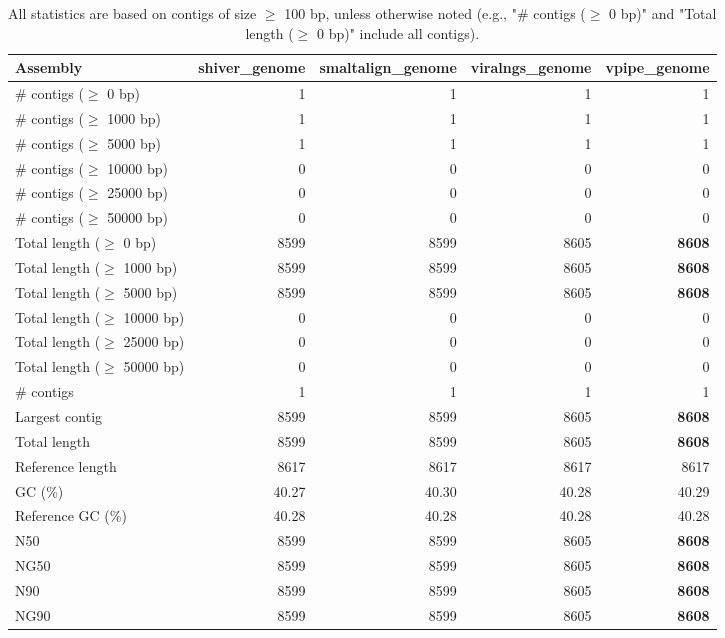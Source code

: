\documentclass[12pt,a4paper]{article}
\begin{document}
\begin{table}[ht]
\begin{center}
\caption{All statistics are based on contigs of size $\geq$ 100 bp, unless otherwise noted (e.g., "\# contigs ($\geq$ 0 bp)" and "Total length ($\geq$ 0 bp)" include all contigs).}
\begin{tabular}{|l*{4}{|r}|}
\hline
Assembly & shiver\_genome & smaltalign\_genome & viralngs\_genome & vpipe\_genome \\ \hline
\# contigs ($\geq$ 0 bp) & 1 & 1 & 1 & 1 \\ \hline
\# contigs ($\geq$ 1000 bp) & 1 & 1 & 1 & 1 \\ \hline
\# contigs ($\geq$ 5000 bp) & 1 & 1 & 1 & 1 \\ \hline
\# contigs ($\geq$ 10000 bp) & 0 & 0 & 0 & 0 \\ \hline
\# contigs ($\geq$ 25000 bp) & 0 & 0 & 0 & 0 \\ \hline
\# contigs ($\geq$ 50000 bp) & 0 & 0 & 0 & 0 \\ \hline
Total length ($\geq$ 0 bp) & 8599 & 8599 & 8605 & {\bf 8608} \\ \hline
Total length ($\geq$ 1000 bp) & 8599 & 8599 & 8605 & {\bf 8608} \\ \hline
Total length ($\geq$ 5000 bp) & 8599 & 8599 & 8605 & {\bf 8608} \\ \hline
Total length ($\geq$ 10000 bp) & 0 & 0 & 0 & 0 \\ \hline
Total length ($\geq$ 25000 bp) & 0 & 0 & 0 & 0 \\ \hline
Total length ($\geq$ 50000 bp) & 0 & 0 & 0 & 0 \\ \hline
\# contigs & 1 & 1 & 1 & 1 \\ \hline
Largest contig & 8599 & 8599 & 8605 & {\bf 8608} \\ \hline
Total length & 8599 & 8599 & 8605 & {\bf 8608} \\ \hline
Reference length & 8617 & 8617 & 8617 & 8617 \\ \hline
GC (\%) & 40.27 & 40.30 & 40.28 & 40.29 \\ \hline
Reference GC (\%) & 40.28 & 40.28 & 40.28 & 40.28 \\ \hline
N50 & 8599 & 8599 & 8605 & {\bf 8608} \\ \hline
NG50 & 8599 & 8599 & 8605 & {\bf 8608} \\ \hline
N90 & 8599 & 8599 & 8605 & {\bf 8608} \\ \hline
NG90 & 8599 & 8599 & 8605 & {\bf 8608} \\ \hline

\end{tabular}
\end{center}
\end{table}
\end{document}
